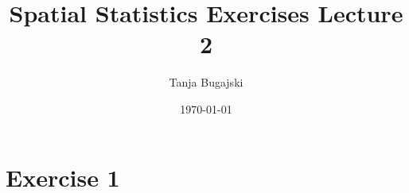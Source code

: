 \documentclass{article}
\title{Spatial Statistics Exercises Lecture 2}
\author{Tanja Bugajski}
\date{\today}
\begin{document}
\maketitle
\section*{Exercise 1}
\end{document}
